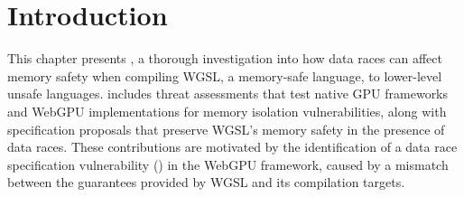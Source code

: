 \section{Introduction}

This chapter presents \saferace, a thorough investigation into how data races can affect memory safety when compiling WGSL, a memory-safe language, to lower-level unsafe languages. \saferace includes threat assessments that test native GPU frameworks and WebGPU implementations for memory isolation vulnerabilities, along with specification proposals that preserve WGSL's memory safety in the presence of data races. These contributions are motivated by the identification of a data race specification vulnerability (\drsv) in the WebGPU framework, caused by a mismatch between the guarantees provided by WGSL and its compilation targets.

